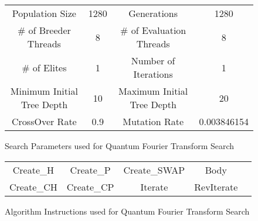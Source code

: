 \begin{figure}[h!]
\begin{center}
 \begin{tabular}{|cc|cc|}
\hline
  Population Size & 1280 & Generations & 1280 \\
  \# of Breeder Threads & 8 & \# of Evaluation Threads & 8 \\
  \# of Elites & 1 & Number of Iterations & 1 \\
  Minimum Initial Tree Depth & 10 & Maximum Initial Tree Depth & 20 \\
  CrossOver Rate & 0.9 & Mutation Rate & 0.003846154 \\
\hline
 \end{tabular}

\end{center}
\caption{Search Parameters used for Quantum Fourier Transform Search}
\label{fig:qftparams}
\end{figure}

\begin{figure}[h!]
\begin{center}
 \begin{tabular}{|ccccc|}
\hline
  Create\_H & Create\_P & Create\_SWAP & Body \\
  Create\_CH  & Create\_CP & Iterate & RevIterate\\
\hline
 \end{tabular}
\end{center}
\caption{Algorithm Instructions used for Quantum Fourier Transform Search}
\label{fig:qftgates}
\end{figure}


